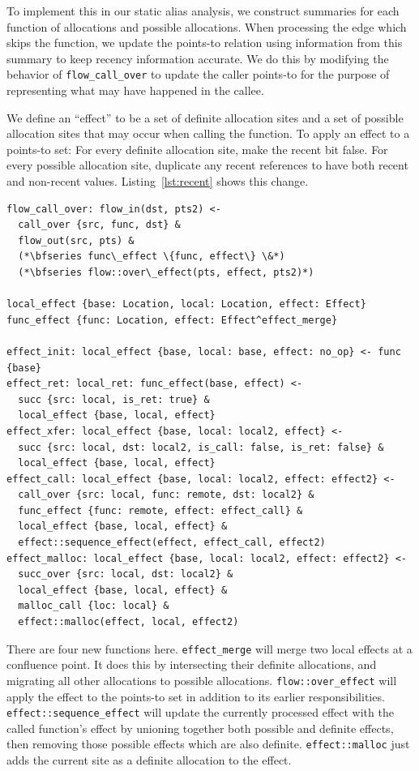 To implement this in our static alias analysis, we construct summaries for each function of allocations and possible allocations.
When processing the edge which skips the function, we update the points-to relation using information from this summary to keep recency information accurate.
We do this by modifying the behavior of \texttt{flow\_call\_over} to update the caller points-to for the purpose of representing what may have happened in the callee.

We define an ``effect'' to be a set of definite allocation sites and a set of possible allocation sites that may occur when calling the function.
To apply an effect to a points-to set:
For every definite allocation site, make the recent bit false.
For every possible allocation site, duplicate any recent references to have both recent and non-recent values.
Listing~\ref{lst:recent} shows this change.

\begin{lstlisting}[float=*t, caption={Rules for Recent Domain}, label=lst:recent]
flow_call_over: flow_in(dst, pts2) <-
  call_over {src, func, dst} &
  flow_out(src, pts) &
  (*\bfseries func\_effect \{func, effect\} \&*)
  (*\bfseries flow::over\_effect(pts, effect, pts2)*)

local_effect {base: Location, local: Location, effect: Effect}
func_effect {func: Location, effect: Effect^effect_merge}

effect_init: local_effect {base, local: base, effect: no_op} <- func {base}
effect_ret: local_ret: func_effect(base, effect) <-
  succ {src: local, is_ret: true} &
  local_effect {base, local, effect}
effect_xfer: local_effect {base, local: local2, effect} <-
  succ {src: local, dst: local2, is_call: false, is_ret: false} &
  local_effect {base, local, effect}
effect_call: local_effect {base, local: local2, effect: effect2} <-
  call_over {src: local, func: remote, dst: local2} &
  func_effect {func: remote, effect: effect_call} &
  local_effect {base, local, effect} &
  effect::sequence_effect(effect, effect_call, effect2)
effect_malloc: local_effect {base, local: local2, effect: effect2} <-
  succ_over {src: local, dst: local2} &
  local_effect {base, local, effect} &
  malloc_call {loc: local} &
  effect::malloc(effect, local, effect2)
\end{lstlisting}

There are four new functions here.
\texttt{effect\_merge} will merge two local effects at a confluence point.
It does this by intersecting their definite allocations, and migrating all other allocations to possible allocations.
\texttt{flow::over\_effect} will apply the effect to the points-to set in addition to its earlier responsibilities.
\texttt{effect::sequence\_effect} will update the currently processed effect with the called function's effect by unioning together both possible and definite effects, then removing those possible effects which are also definite.
\texttt{effect::malloc} just adds the current site as a definite allocation to the effect.

